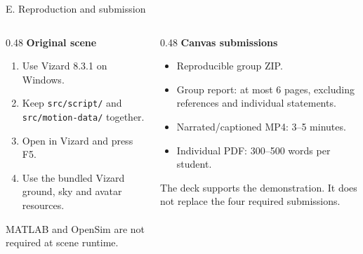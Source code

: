 \begin{frame}{E. Reproduction and submission}
\begin{columns}[T,onlytextwidth]
\begin{column}{0.48\textwidth}
\textbf{Original scene}
\begin{enumerate}\small
\item Use Vizard 8.3.1 on Windows.
\item Keep \texttt{src/script/} and \texttt{src/motion-data/} together.
\item Open  in Vizard and press F5.
\item Use the bundled Vizard ground, sky and avatar resources.
\end{enumerate}
\par\smallskip\small MATLAB and OpenSim are not required at scene runtime.
\end{column}
\begin{column}{0.48\textwidth}
\textbf{Canvas submissions}
\begin{itemize}\small
\item Reproducible group ZIP.
\item Group report: at most 6 pages, excluding references and individual statements.
\item Narrated/captioned MP4: 3--5 minutes.
\item Individual PDF: 300--500 words per student.
\end{itemize}
\par\smallskip\small The deck supports the demonstration. It does not replace the four required submissions.
\end{column}
\end{columns}
\end{frame}

